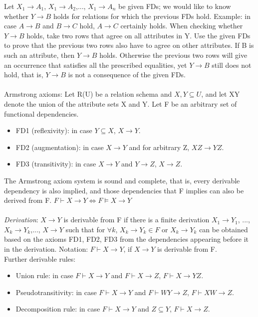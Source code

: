 \documentclass[margin=0px]{article}
\begin{document}
Let $X_1 \to A_1$, $X_1 \to A_2$,..., $X_1 \to A_n$ be given FDs; we would like to know whether $Y \to B$ holds for relations for which the previous FDs hold. Example: in case $A \to B$ and $B \to C$ hold, $A \to C$ certainly holds. When checking whether $Y \to B$ holds, take two rows that agree on all attributes in Y. Use the given FDs to prove that the previous two rows also have to agree on other attributes. If B is such an attribute, then $Y \to B$ holds. Otherwise the previous two rows will give an occurrence that satisfies all the prescribed equalities, yet $Y \to B$ still does not hold, that is, $Y \to B$ is not a consequence of the given FDs. \\ \\
Armstrong axioms: Let R(U) be a relation schema and $X,Y \subseteq U$, and let XY denote the union of the attribute sets X and Y. Let F be an arbitrary set of functional dependencies. \\
\begin{itemize}
    \item FD1 (reflexivity): in case $Y \subseteq X$, $X \to Y$.
    \item FD2 (augmentation): in case $X \to Y$ and for arbitrary Z, $XZ \to YZ$.
    \item FD3 (transitivity): in case $X \to Y$ and $Y \to Z$, $X \to Z$.
\end{itemize}
The Armstrong axiom system is sound and complete, that is, every derivable dependency is also implied, and those dependencies that F implies can also be derived from F. $F \vdash X \to Y \iff F \models X \to Y$\\ \\
\textit{Derivation}: $X \to Y$ is derivable from F if there is a finite derivation $X_1 \to Y_1$, ..., $X_k \to Y_k$,..., $X \to Y$ such that for $\forall k$, $X_k \to Y_k \in F$ or $X_k \to Y_k$ can be obtained based on the axioms FD1, FD2, FD3 from the dependencies appearing before it in the derivation. Notation: $F \vdash X \to Y$, if $X \to Y$ is derivable from F. \\
Further derivable rules:
\begin{itemize}
    \item Union rule: in case $F \vdash X \to Y$ and $F \vdash X \to Z$, $F \vdash X \to YZ$.
    \item Pseudotransitivity: in case $F \vdash X \to Y$ and $F \vdash WY \to Z$, $F \vdash XW \to Z$.
    \item Decomposition rule: in case $F \vdash X \to Y$ and $Z \subseteq Y$, $F \vdash X \to Z$.
\end{itemize}
\end{document}
